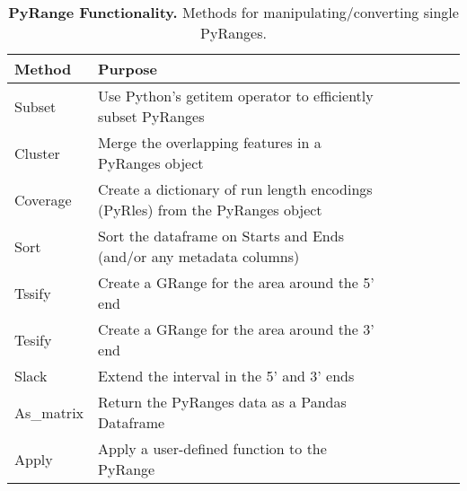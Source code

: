 \documentclass[10pt,letterpaper]{article}
\begin{document}
\begin{table}[!ht]
\begin{adjustwidth}{-1.5in}{0in}
\centering
\caption{{\bf PyRange Functionality.} Methods for manipulating/converting single PyRanges.}
\begin{tabular}{|l|l|l|l|l|l|l|}
\hline
  {\bf Method} & {\bf Purpose} \\ \hline
  Subset & Use Python's getitem operator to efficiently subset PyRanges \\ \hline
  Cluster & Merge the overlapping features in a PyRanges object \\ \hline
  Coverage & Create a dictionary of run length encodings (PyRles) from the PyRanges object \\ \hline
  Sort & Sort the dataframe on Starts and Ends (and/or any metadata columns) \\ \hline
  Tssify & Create a GRange for the area around the 5' end \\ \hline
  Tesify & Create a GRange for the area around the 3' end \\ \hline
  Slack & Extend the interval in the 5' and 3' ends \\ \hline
  As\_matrix & Return the PyRanges data as a Pandas Dataframe \\ \hline
  Apply & Apply a user-defined function to the PyRange \\ \hline
\end{tabular}
\label{tab1}
\end{adjustwidth}
\end{table}
\end{document}
